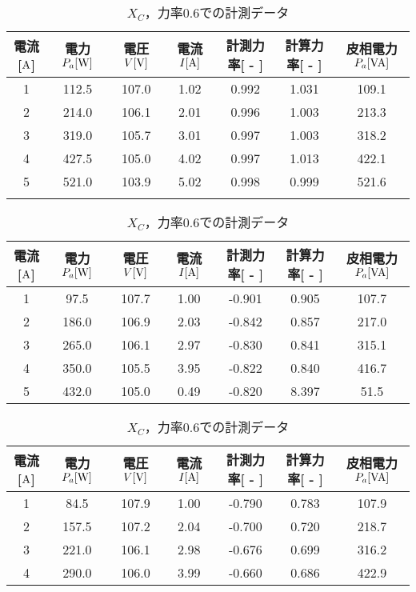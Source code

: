 \begin{itemize}
\begin{table}[h]
\begin{tabular}{ccccccc}
\end{tabular}
\end{table}
\begin{table}[h]
\centering
	\caption{$X_{C}$，力率$1.0$での計測データ}
	\label{tab:1data2}
\begin{tabular}{ccccccc}
	\hline
	電流[$\rm{A}$] & 電力$P_a[\rm{W}]$ & 電圧$V[\rm{V}]$ & 電流$I[\rm{A}]$ & 計測力率[ - ] & 計算力率[ - ] & 皮相電力$P_a[\rm{VA}]$ \\ \hline
	1 & 112.5 & 107.0 & 1.02 & 0.992 & 1.031 & 109.1 \\
	2 & 214.0 & 106.1 & 2.01 & 0.996 & 1.003 & 213.3 \\
	3 & 319.0 & 105.7 & 3.01 & 0.997 & 1.003 & 318.2 \\
	4 & 427.5 & 105.0 & 4.02 & 0.997 & 1.013 & 422.1 \\
	5 & 521.0 & 103.9 & 5.02 & 0.998 & 0.999 & 521.6 \\ \hline\\
\end{tabular}
	\caption{$X_{C}$，力率$0.8$での計測データ}
	\label{tab:0.8data2}
\begin{tabular}{ccccccc}
	\hline
	電流[$\rm{A}$] & 電力$P_a[\rm{W}]$ & 電圧$V[\rm{V}]$ & 電流$I[\rm{A}]$ & 計測力率[ - ] & 計算力率[ - ] & 皮相電力$P_a[\rm{VA}]$ \\ \hline
	1 & 97.5  & 107.7 & 1.00 & -0.901 & 0.905 & 107.7 \\
	2 & 186.0 & 106.9 & 2.03 & -0.842 & 0.857 & 217.0 \\
	3 & 265.0 & 106.1 & 2.97 & -0.830 & 0.841 & 315.1 \\
	4 & 350.0 & 105.5 & 3.95 & -0.822 & 0.840 & 416.7 \\
	5 & 432.0 & 105.0 & 0.49 & -0.820 & 8.397 & 51.5  \\ \hline
\end{tabular}
	\caption{$X_{C}$，力率$0.6$での計測データ}
	\label{tab:0.6data2}
\begin{tabular}{ccccccc}
	\hline
	電流[$\rm{A}$] & 電力$P_a[\rm{W}]$ & 電圧$V[\rm{V}]$ & 電流$I[\rm{A}]$ & 計測力率[ - ] & 計算力率[ - ] & 皮相電力$P_a[\rm{VA}]$ \\ \hline
	1 & 84.5  & 107.9 & 1.00 & -0.790 & 0.783 & 107.9 \\
	2 & 157.5 & 107.2 & 2.04 & -0.700 & 0.720 & 218.7 \\
	3 & 221.0 & 106.1 & 2.98 & -0.676 & 0.699 & 316.2 \\
	4 & 290.0 & 106.0 & 3.99 & -0.660 & 0.686 & 422.9 \\

\end{tabular}
\end{table}
\end{itemize}
